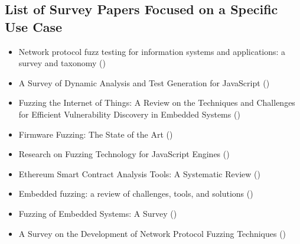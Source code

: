 \documentclass{article}
\begin{document}
\begin{multicols}{2}
    \subsection{List of Survey Papers Focused on a Specific Use Case}
    \label{SpecificSurveyPapers}
    \begin{itemize}
        \item    Network protocol fuzz testing for information systems and applications: a survey and taxonomy ()\cite{Network}
        \item    A Survey of Dynamic Analysis and Test Generation for JavaScript ()\cite{JavaScript2}
        \item    Fuzzing the Internet of Things: A Review on the Techniques and Challenges for Efficient Vulnerability Discovery in Embedded Systems ()\cite{IoT}
        \item    Firmware Fuzzing: The State of the Art ()\cite{Firmware}
        \item    Research on Fuzzing Technology for JavaScript Engines ()\cite{JavaScript}
        \item    Ethereum Smart Contract Analysis Tools: A Systematic Review ()\cite{Ethereum}
        \item    Embedded fuzzing: a review of challenges, tools, and solutions ()\cite{Embedded2}
        \item    Fuzzing of Embedded Systems: A Survey ()\cite{Embedded}
        \item    A Survey on the Development of Network Protocol Fuzzing Techniques ()\cite{Network2023}
    \end{itemize}

\end{multicols}
\end{document}
